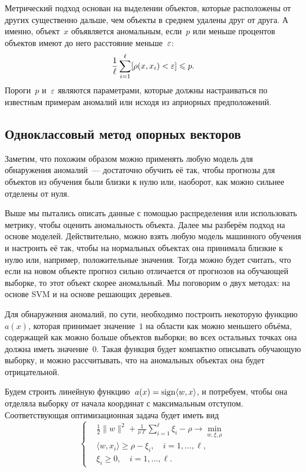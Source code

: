 \documentclass[12pt,fleqn]{article}
\begin{document}
Метрический подход основан на выделении объектов, которые расположены от других
существенно дальше, чем объекты в среднем удалены друг от друга.
А именно, объект~$x$ объявляется аномальным, если~$p$ или меньше процентов объектов
имеют до него расстояние меньше~$\varepsilon$:
\[
    \frac{1}{\ell}
    \sum_{i = 1}^{\ell}
        [\rho(x, x_i) < \varepsilon]
    \leqslant
    p.
\]
Пороги~$p$ и~$\varepsilon$ являются параметрами, которые должны настраиваться
по известным примерам аномалий или исходя из априорных предположений.

\subsection{Одноклассовый метод опорных векторов}

Заметим, что похожим образом можно применять любую модель для обнаружения аномалий~---
достаточно обучить её так, чтобы прогнозы для объектов из обучения были близки к нулю
или, наоборот, как можно сильнее отделены от нуля.

Выше мы пытались описать данные с помощью распределения или использовать метрику, чтобы оценить аномальность объекта.
Далее мы разберём подход на основе моделей.
Действительно, можно взять любую модель машинного обучения и настроить её так,
чтобы на нормальных объектах она принимала близкие к нулю или, например, положительные значения.
Тогда можно будет считать, что если на новом объекте прогноз сильно отличается от прогнозов на обучающей выборке,
то этот объект скорее аномальный.
Мы поговорим о двух методах: на основе SVM и на основе решающих деревьев.

Для обнаружения аномалий, по сути, необходимо построить некоторую функцию~$a(x)$,
которая принимает значение~$1$ на области как можно меньшего объёма,
содержащей как можно больше объектов выборки; во всех остальных точках она
должна иметь значение~$0$.
Такая функция будет компактно описывать обучающую выборку,
и можно рассчитывать, что на аномальных объектах она будет отрицательной.

Будем строить линейную функцию~$a(x) = \mathop{\rm sign}\limits \langle w, x \rangle$, и потребуем,
чтобы она отделяла выборку от начала координат с максимальным отступом.
Соответствующая оптимизационная задача будет иметь вид~\cite{scholkopf99oneclass}
\[
    \left\{
        \begin{aligned}
            & \frac{1}{2} \|w\|^2
            +
            \frac{1}{\nu \ell} \sum_{i = 1}^{\ell} \xi_i
            -
            \rho
            \to \min_{w, \xi, \rho} \\
            & \langle w, x_i \rangle
            \geq
            \rho - \xi_i,
            \quad i = 1, \dots, \ell, \\
            & \xi_i \geq 0, \quad i = 1, \dots, \ell.
        \end{aligned}
    \right.
\]
\end{document}
